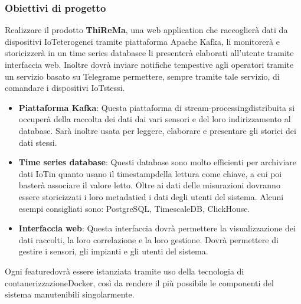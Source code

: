 \subsubsection{Obiettivi di progetto}
Realizzare il prodotto \textbf{ThiReMa}, una web application che raccoglierà dati da dispositivi IoT\glosp eterogenei tramite piattaforma Apache Kafka, li monitorerà e storicizzerà in un time series database\glosp e li presenterà elaborati all'utente tramite interfaccia web. Inoltre dovrà inviare notifiche tempestive agli operatori tramite un servizio basato su Telegram\glo e permettere, sempre tramite tale servizio, di comandare i dispositivi IoT\glosp stessi.
\begin{itemize}
	\item \textbf{Piattaforma Kafka}: Questa piattaforma di stream-processing\glosp distribuita si occuperà della raccolta dei dati dai vari sensori e del loro indirizzamento al database. Sarà inoltre usata per leggere, elaborare e presentare gli storici dei dati stessi.
	\item \textbf{Time series database}: Questi database sono molto efficienti per archiviare dati IoT\glosp in quanto usano il timestamp\glosp della lettura come chiave, a cui poi basterà associare il valore letto. Oltre ai dati delle misurazioni dovranno essere storicizzati i loro metadati\glosp ed i dati degli utenti del sistema.
	Alcuni esempi consigliati sono: PostgreSQL\glo, TimescaleDB\glo, ClickHouse\glo.
	\item \textbf{Interfaccia web}: Questa interfaccia dovrà permettere la visualizzazione dei dati raccolti, la loro correlazione e la loro gestione. Dovrà permettere di gestire i sensori, gli impianti e gli utenti del sistema.
\end{itemize} 
Ogni feature\glosp dovrà essere istanziata tramite uso della tecnologia di contanerizzazione\glosp Docker\glo, così da rendere il più possibile le componenti del sistema manutenibili singolarmente.


